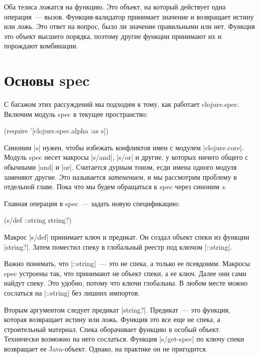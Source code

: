 Оба тезиса ложатся на функцию. Это объект, на который действует одна
операция~--- вызов. Функция-валидатор принимает значение и возвращает истину или
ложь. Это ответ на вопрос, было ли значение правильными или нет. Функция это
объект высшего порядка, поэтому другие функции принимают их и порождают
комбинации.


\section{Основы spec}

С багажом этих рассуждений мы подходим к тому, как работает
clojure.spec. Включим модуль spec в текущее пространство:

\begin{english}
  \begin{clojure}
(require '[clojure.spec.alpha :as s])
  \end{clojure}
\end{english}

Синоним \spverb|s| нужен, чтобы избежать конфликтов имен с модулем
\spverb|clojure.core|. Модуль spec несет макросы \spverb|s/and|, \spverb|s/or|
и другие, у которых ничего общего с обычными \spverb|and| и \spverb|or|. Считается
дурным тоном, есди имена одного модуля заменяют другие. Это называется \emph{затенением},
и мы рассмотрим проблему в отдельной главе. Пока что мы будем обращаться к spec
через синоним \emph{s}.

Главная операция в spec~--- задать новую спецификацию:

\begin{english}
  \begin{clojure}
(s/def ::string string?)
  \end{clojure}
\end{english}

Макрос \spverb|s/def| принимает ключ и предикат. Он создал объект спеки из функции
\spverb|string?|. Затем поместил спеку в глобальный реестр под ключом \spverb|::string|.

Важно понимать, что \spverb|::string|~--- это не спека, а только ее
псевдоним. Макросы spec устроены так, что принимают не объект спеки, а ее
ключ. Далее они сами найдут спеку. Это удобно, потому что ключи глобальны. В
любом месте можно сослаться на \spverb|::string| без лишних импортов.

Вторым аргументом следует предикат \spverb|string?|. Предикат~--- это функция,
которая возвращает истину или ложь. Функция это все еще не спека, а строительный
материал. Спека оборачивает функцию в особый объект. Технически возможно на него
сослаться. Функция \spverb|s/get-spec| по ключу спеки возвращает ее
Java-объект. Однако, на практике он не пригодится.

